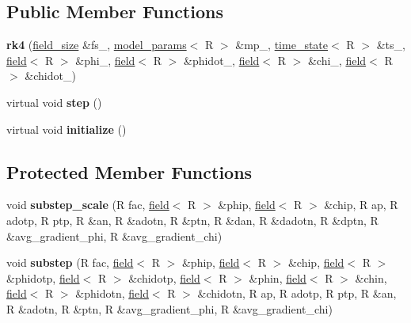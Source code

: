 \subsection*{Public Member Functions}
\begin{DoxyCompactItemize}
\item 
\hypertarget{classrk4_a6b6538e79bab2ccb9b65b953f8871073}{
{\bfseries rk4} (\hyperlink{structfield__size}{field\_\-size} \&fs\_\-, \hyperlink{structmodel__params}{model\_\-params}$<$ R $>$ \&mp\_\-, \hyperlink{structtime__state}{time\_\-state}$<$ R $>$ \&ts\_\-, \hyperlink{classfield}{field}$<$ R $>$ \&phi\_\-, \hyperlink{classfield}{field}$<$ R $>$ \&phidot\_\-, \hyperlink{classfield}{field}$<$ R $>$ \&chi\_\-, \hyperlink{classfield}{field}$<$ R $>$ \&chidot\_\-)}
\label{classrk4_a6b6538e79bab2ccb9b65b953f8871073}

\item 
\hypertarget{classrk4_a10c9b1ff5a625427a90f5d235c0d4aec}{
virtual void {\bfseries step} ()}
\label{classrk4_a10c9b1ff5a625427a90f5d235c0d4aec}

\item 
\hypertarget{classrk4_a1925c4efac74de9bec188b4c6c5a3b1c}{
virtual void {\bfseries initialize} ()}
\label{classrk4_a1925c4efac74de9bec188b4c6c5a3b1c}

\end{DoxyCompactItemize}
\subsection*{Protected Member Functions}
\begin{DoxyCompactItemize}
\item 
\hypertarget{classrk4_a32ca7b0812b646d626ef2581e9a7558d}{
void {\bfseries substep\_\-scale} (R fac, \hyperlink{classfield}{field}$<$ R $>$ \&phip, \hyperlink{classfield}{field}$<$ R $>$ \&chip, R ap, R adotp, R ptp, R \&an, R \&adotn, R \&ptn, R \&dan, R \&dadotn, R \&dptn, R \&avg\_\-gradient\_\-phi, R \&avg\_\-gradient\_\-chi)}
\label{classrk4_a32ca7b0812b646d626ef2581e9a7558d}

\item 
\hypertarget{classrk4_ab6588276335620de871fadf2065059b9}{
void {\bfseries substep} (R fac, \hyperlink{classfield}{field}$<$ R $>$ \&phip, \hyperlink{classfield}{field}$<$ R $>$ \&chip, \hyperlink{classfield}{field}$<$ R $>$ \&phidotp, \hyperlink{classfield}{field}$<$ R $>$ \&chidotp, \hyperlink{classfield}{field}$<$ R $>$ \&phin, \hyperlink{classfield}{field}$<$ R $>$ \&chin, \hyperlink{classfield}{field}$<$ R $>$ \&phidotn, \hyperlink{classfield}{field}$<$ R $>$ \&chidotn, R ap, R adotp, R ptp, R \&an, R \&adotn, R \&ptn, R \&avg\_\-gradient\_\-phi, R \&avg\_\-gradient\_\-chi)}
\label{classrk4_ab6588276335620de871fadf2065059b9}

\end{DoxyCompactItemize}
